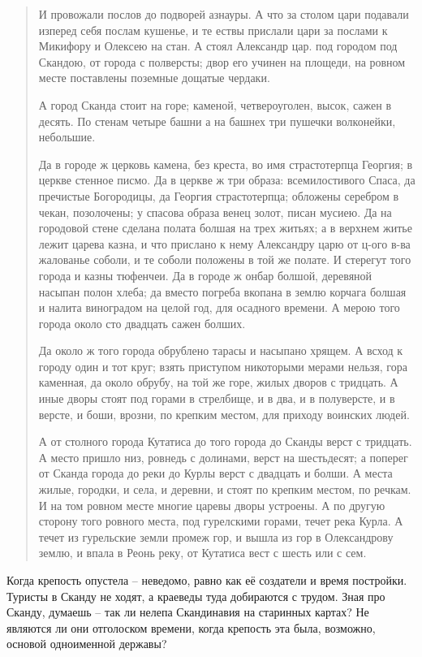 \begin{quotation}
И провожали послов до подворей азнауры. А что за столом цари подавали изперед себя послам кушенье, и те ествы прислали цари за послами к Микифору и Олексею на стан. А стоял Александр цар. под городом под Скандою, от города с полверсты; двор его учинен на площеди, на ровном месте поставлены поземные дощатые чердаки.

А город Сканда стоит на горе; каменой, четвероуголен, высок, сажен в десять. По стенам четыре башни а на башнех три пушечки волконейки, небольшие.

Да в городе ж церковь камена, без креста, во имя страстотерпца Георгия; в церкве стенное писмо. Да в церкве ж три образа: всемилостивого Спаса, да пречистые Богородицы, да Георгия страстотерпца; обложены серебром в чекан, позолочены; у спасова образа венец золот, писан мусиею. Да на городовой стене сделана полата болшая на трех житьях; а в верхнем житье лежит царева казна, и что прислано к нему Александру царю от ц-ого в-ва жалованье соболи, и те соболи положены в той же полате. И стерегут того города и казны тюфенчеи. Да в городе ж онбар болшой, деревяной насыпан полон хлеба; да вместо погреба вкопана в землю корчага болшая и налита виноградом на целой год, для осадного времени. А мерою того города около сто двадцать сажен болших.

Да около ж того города обрублено тарасы и насыпано хрящем. А всход к городу один и тот круг; взять приступом никоторыми мерами нельзя, гора каменная, да около обрубу, на той же горе, жилых дворов с тридцать. А иные дворы стоят под горами в стрелбище, и в два, и в полуверсте, и в версте, и боши, врозни, по крепким местом, для приходу воинских людей.

А от столного города Кутатиса до того города до Сканды верст с тридцать. А место пришло низ, ровнедь с долинами, верст на шестьдесят; а поперег от Сканда города до реки до Курлы верст с двадцать и болши. А места жилые, городки, и села, и деревни, и стоят по крепким местом, по речкам. И на том ровном месте многие царевы дворы устроены. А по другую сторону того ровного места, под гурелскими горами, течет река Курла. А течет из гурельские земли промеж гор, и вышла из гор в Олександрову землю, и впала в Реонь реку, от Кутатиса вест с шесть или с сем.
\end{quotation}

Когда крепость опустела – неведомо, равно как её создатели и время постройки. Туристы в Сканду не ходят, а краеведы туда добираются с трудом. Зная про Сканду, думаешь – так ли нелепа Скандинавия на старинных картах? Не являются ли они отголоском времени, когда крепость эта была, возможно, основой одноименной державы?

